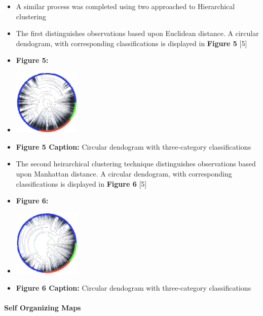 \documentclass[12pt,]{article}
\providecommand{\tightlist}{%
  \setlength{\itemsep}{0pt}\setlength{\parskip}{0pt}}
\let\oldparagraph\paragraph
\renewcommand{\paragraph}[1]{\oldparagraph{#1}\mbox{}}
\begin{document}
\begin{itemize}
  \begin{itemize}
  \tightlist
  \item
    A similar process was completed using two approached to Hierarchical
    clustering
  \item
    The first distinguishes observations based upon Euclidean distance.
    A circular dendogram, with corresponding classifications is
    displayed in \textbf{Figure 5} {[}5{]}
  \item
    \textbf{Figure 5:}
  \item
    \includegraphics[width=0.25\textwidth,height=\textheight]{Hclust1Dend.jpeg}
  \item
    \textbf{Figure 5 Caption:} Circular dendogram with three-category
    classifications
  \item
    The second heirarchical clustering technique distinguishes
    observations based upon Manhattan distance. A circular dendogram,
    with corresponding classifications is displayed in \textbf{Figure 6}
    {[}5{]}
  \item
    \textbf{Figure 6:}
  \item
    \includegraphics[width=0.25\textwidth,height=\textheight]{Hclust2Dend.jpeg}
  \item
    \textbf{Figure 6 Caption:} Circular dendogram with three-category
    classifications
  \end{itemize}
\end{itemize}

\hypertarget{self-organizing-maps}{%
\paragraph{Self Organizing Maps}\label{self-organizing-maps}}
\end{document}
